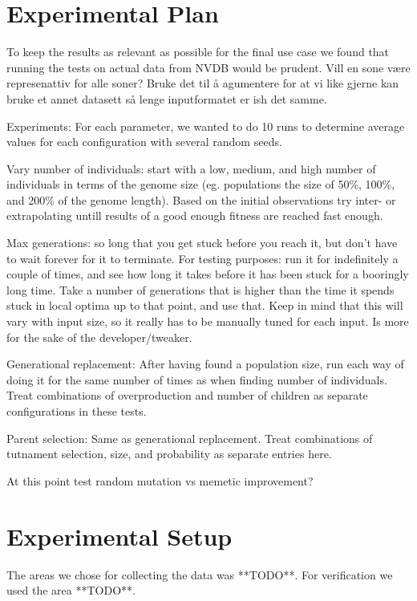 \section{Experimental Plan} %
\label{sec:experimental_plan}
To keep the results as relevant as possible for the final use case we found that running the tests on actual data from NVDB would be prudent. Vill en sone være represenattiv for alle soner? Bruke det til å agumentere for at vi like gjerne kan bruke et annet datasett så lenge inputformatet er ish det samme.

Experiments:
For each parameter, we wanted to do 10 runs to determine average values for each configuration with several random seeds. 

Vary number of individuals: start with a low, medium, and high number of individuals in terms of the genome size (eg. populations the size of 50\%, 100\%, and 200\% of the genome length). Based on the initial observations try inter- or extrapolating untill results of a good enough fitness are reached fast enough.

Max generations: so long that you get stuck before you reach it, but don't have to wait forever for it to terminate. For testing purposes: run it for indefinitely a couple of times, and see how long it takes before it has been stuck for a booringly long time. Take a number of generations that is higher than the time it spends stuck in local optima up to that point, and use that.
Keep in mind that this will vary with input size, so it really has to be manually tuned for each input. Is more for the sake of the developer/tweaker.

Generational replacement: After having found a population size, run each way of doing it for the same number of times as when finding number of individuals. Treat combinations of overproduction and number of children as separate configurations in these tests.

Parent selection: Same as generational replacement. Treat combinations of tutnament selection, size, and probability as separate entries here.

At this point test random mutation vs memetic improvement?

\section{Experimental Setup} %
\label{sec:experimental_setup}
The areas we chose for collecting the data was **TODO**. For verification we used the area **TODO**.

